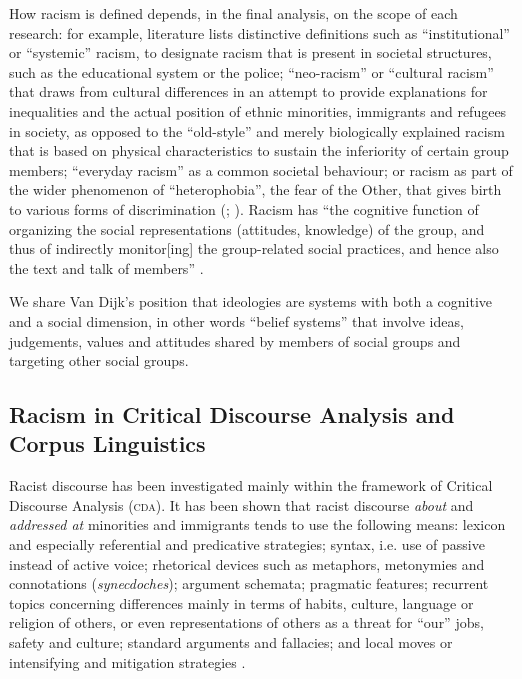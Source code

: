\documentclass[output=paper]{LSP/langsci}
\begin{document}
How racism is defined depends, in the final analysis, on the scope of each research: for example, literature lists distinctive definitions such as “institutional” or “systemic” racism, to designate racism that is present in societal structures, such as the educational system or the police; “neo-racism” or “cultural racism” that draws from cultural differences in an attempt to provide explanations for inequalities and the actual position of ethnic minorities, immigrants and refugees in society, as opposed to the “old-style” and merely biologically explained racism that is based on physical characteristics to sustain the inferiority of certain group members; “everyday racism” as a common societal behaviour; or racism as part of the wider phenomenon of “heterophobia”, the fear of the Other, that gives birth to various forms of discrimination (\citealt{Essed1991,Reisigl2001}; \citealt[118]{Memmi2000}). Racism has “the cognitive function of organizing the social representations (attitudes, knowledge) of the group, and thus of indirectly monitor[ing] the group-related social practices, and hence also the text and talk of members” \citep[248]{Dijk1995}.

We share Van Dijk's position that ideologies are systems with both a cognitive and a social dimension, in other words “belief systems” that involve ideas, judgements, values and attitudes shared by members of social groups and targeting other social groups.

\subsection{Racism in Critical Discourse Analysis and Corpus Linguistics} \label{sec:2:2:2}
Racist discourse has been investigated mainly within the framework of Critical Discourse Analysis (\textsc{cda}). It has been shown that racist discourse \textit{about} and \textit{addressed at} minorities and immigrants tends to use the following means: lexicon and especially referential and predicative strategies; syntax, i.e. use of passive instead of active voice; rhetorical devices such as metaphors, metonymies and connotations (\textit{synecdoches}); argument schemata; pragmatic features; recurrent topics concerning differences mainly in terms of habits, culture, language or religion of others, or even representations of others as a threat for “our” jobs, safety and culture; standard arguments and fallacies; and local moves or intensifying and mitigation strategies \citep{Reisigl2001,Dijk2000a,Dijk2000b, Dijk2002}.
\end{document}
